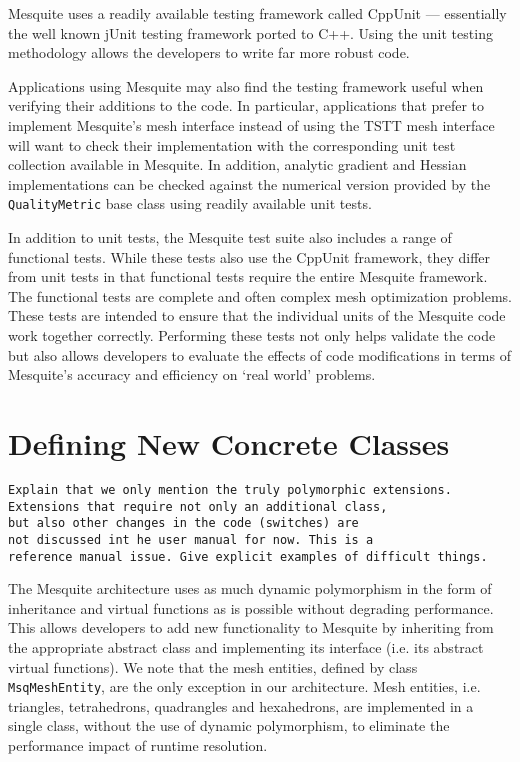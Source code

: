 Mesquite uses a readily available testing framework called CppUnit
\cite{cppunit} --- essentially the well known jUnit testing framework
ported to C++.  Using the unit testing methodology allows the
developers to write far more robust code.

Applications using Mesquite may also find the testing framework useful
when verifying their additions to the code. In particular,
applications that prefer to implement Mesquite's mesh interface
instead of using the TSTT mesh interface will want to
check their implementation with the corresponding unit test collection
available in Mesquite. In addition, analytic gradient and Hessian
implementations can be checked against the numerical version provided
by the {\tt QualityMetric} base class using readily available unit
tests.

In addition to unit tests, the Mesquite test suite also includes
a range of functional tests.  While these tests also use the
CppUnit framework, they differ from unit tests in that 
functional tests require the entire Mesquite framework.
The functional tests are complete and often complex mesh
optimization problems.  These tests are intended to ensure that
the individual units of the Mesquite code work together correctly.
Performing these tests not only helps
validate the code but also allows developers to evaluate the
effects of code modifications in terms of Mesquite's accuracy
and efficiency on `real world' problems.

\section{Defining New Concrete Classes}

\begin{verbatim}
Explain that we only mention the truly polymorphic extensions. 
Extensions that require not only an additional class, 
but also other changes in the code (switches) are 
not discussed int he user manual for now. This is a 
reference manual issue. Give explicit examples of difficult things. 
\end{verbatim}

The Mesquite architecture uses as much dynamic polymorphism in the
form of inheritance and virtual functions as is possible without
degrading performance.  This allows developers to add new
functionality to Mesquite by inheriting from the appropriate abstract
class and implementing its interface (i.e. its abstract virtual
functions).  We note that the mesh entities, defined by class {\tt
MsqMeshEntity}, are the only exception in our architecture.  Mesh
entities, i.e. triangles, tetrahedrons, quadrangles and hexahedrons,
are implemented in a single class, without the use of dynamic
polymorphism, to eliminate the performance impact of runtime
resolution.

